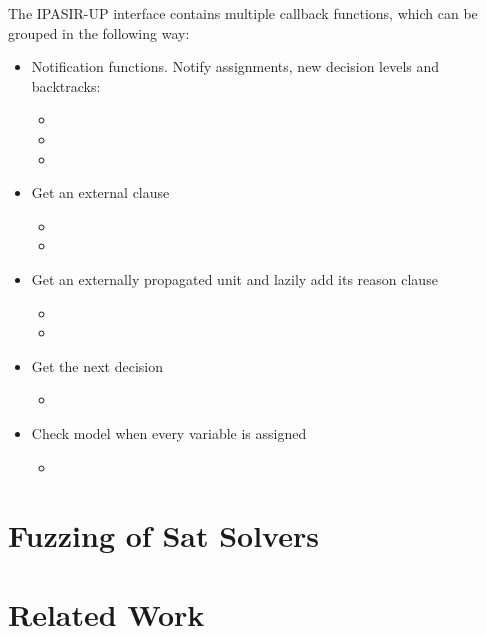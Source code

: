 The IPASIR-UP interface contains multiple callback functions, which can be grouped in the following way:

\begin{itemize}
  \item Notification functions. Notify assignments, new decision levels and backtracks:
    \begin{itemize}
      \item {}
      \item {}
      \item {}
    \end{itemize}
  \item Get an external clause
    \begin{itemize}
      \item {}
      \item {}
    \end{itemize}
  \item Get an externally propagated unit and lazily add its reason clause
    \begin{itemize}
      \item {}
      \item {}
    \end{itemize}
  \item Get the next decision
    \begin{itemize}
      \item {}
    \end{itemize}
  \item Check model when every variable is assigned
    \begin{itemize}
      \item {}
    \end{itemize}
\end{itemize}

\section{Fuzzing of Sat Solvers}



\section{Related Work}


